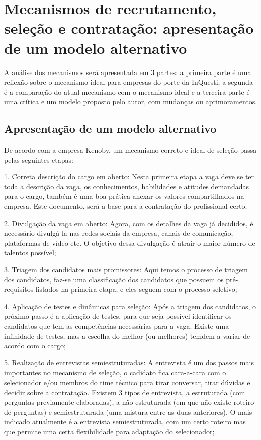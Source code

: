 \chapter{Mecanismos de recrutamento, seleção e contratação: apresentação de um modelo alternativo}
A análise dos mecanismos será apresentada em 3 partes: a primeira parte é uma reflexão sobre o mecanismo ideal para empresas do porte da InQuesti, a segunda 
é a comparação do atual mecanismo com o mecanismo ideal e a terceira parte 
é uma crítica e um modelo proposto pelo autor, com mudanças
ou aprimoramentos. 

\section{Apresentação de um modelo alternativo}
De acordo com a empresa Kenoby, um mecanismo correto e ideal de seleção passa pelas seguintes etapas:

1. Correta descrição do cargo em aberto: 
Nesta primeira etapa a vaga deve se ter toda a descrição da vaga, os conhecimentos, habilidades e atitudes demandadas para o cargo, também é uma boa prática anexar os valores compartilhados na empresa. Este documento, será a base para a contratação do profissional certo;

2. Divulgação da vaga em aberto: 
Agora, com os detalhes da vaga já decididos, é necessário divulgá-la nas redes sociais da empresa, canais de comunicação, plataformas de vídeo etc. O objetivo dessa divulgação é atrair o maior número de talentos possível;

3. Triagem dos candidatos mais promissores: 
Aqui temos o processo de triagem dos candidatos, faz-se uma classificação dos candidatos que possuem os pré-requisitos listados na primeira etapa, e eles seguem com o processo seletivo;

4. Aplicação de testes e dinâmicas para seleção:
Após a triagem dos candidatos, o próximo passo é a aplicação de testes, para que seja possível identificar os candidatos que tem as competências necessárias para a vaga. Existe uma infinidade de testes, mas a escolha do melhor (ou melhores) temdem a variar de acordo com o cargo;

5. Realização de entrevistas semiestruturadas:
A entrevista é um dos passos mais importantes no mecanismo de seleção, o cadidato fica cara-a-cara com o selecionador e/ou membros do time técnico para tirar conversar, tirar dúvidas e decidir sobre a contratação. Existem 3 tipos de entrevista, a estruturada (com perguntas previamente elaboradas), a não estruturada (em que não existe roteiro de perguntas) e semiestruturada (uma mistura entre as duas anteriores). O mais indicado atualmente é a entrevista semiestruturada, com um certo roteiro mas que permite uma certa flexibilidade para adaptação do selecionador;


